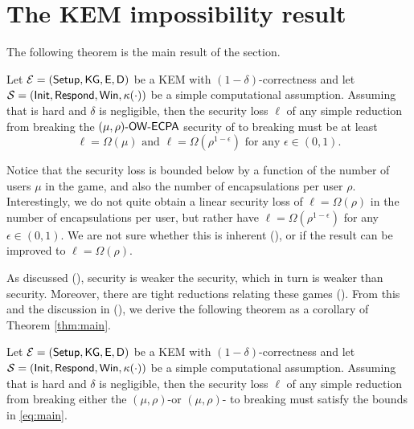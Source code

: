 
\section{The KEM impossibility result}\label{sec:kem}

The following theorem is the main result of the section.

\begin{theorem}\label{thm:main}
  Let \(\mathcal{E} = (\mathsf{Setup},\allowbreak \mathsf{KG},\allowbreak \mathsf{E},\allowbreak \mathsf{D})\) be a KEM
  with \((1-\delta)\)-correctness
  and let \(\mathcal{S} = (\mathsf{Init},\allowbreak \mathsf{Respond},\allowbreak \mathsf{Win},\allowbreak \kappa(\cdot))\)
  be a simple computational assumption.
  Assuming that \Simple is hard and \(\delta\) is negligible,
  then the security loss \(\ell\) of any simple reduction \redR
  from breaking the \((\mu,\rho)\text{-}\mathsf{OW}\text{-}\mathsf{ECPA}\) security of \KEM to breaking \Simple
  must be at least
  \begin{equation}\label{eq:main}
    \ell = \Omega(\mu) \text{ and } \ell = \Omega(\rho^{1-\epsilon}) \text{ for any } \epsilon \in (0,1).
  \end{equation}
\end{theorem}

Notice that the security loss is bounded
below by a function of the number of users \(\mu\)
in the \OWECPA game,
and also the number of encapsulations per user \(\rho\).
Interestingly, we do not quite obtain a linear security loss of \(\ell = \Omega(\rho)\)
in the number of encapsulations per user,
but rather have \(\ell = \Omega(\rho^{1-\epsilon})\) for any \(\epsilon \in (0,1)\).
We are not sure whether this is
inherent (), or if the result can be improved to \(\ell = \Omega(\rho)\).


As discussed (), \OWECPA security is weaker the \INDECPA security,
which in turn is weaker than \INDECCA security.
Moreover, there are tight reductions relating these games
().
From this and the discussion in (),
we derive the following theorem as a corollary of Theorem \ref{thm:main}.

\begin{theorem}
  Let \(\mathcal{E} = (\mathsf{Setup},\allowbreak \mathsf{KG},\allowbreak \mathsf{E},\allowbreak \mathsf{D})\) be a KEM
  with \((1-\delta)\)-correctness
  and let \(\mathcal{S} = (\mathsf{Init},\allowbreak \mathsf{Respond},\allowbreak \mathsf{Win},\allowbreak \kappa(\cdot))\)
  be a simple computational assumption.
  Assuming that \Simple is hard and \(\delta\) is negligible,
  then the security loss \(\ell\) of any simple reduction \redR
  from breaking either the \((\mu,\rho)\)-\INDECPA or \((\mu,\rho)\)-\INDECCA
  to breaking \Simple must satisfy the bounds in \eqref{eq:main}.
\end{theorem}


